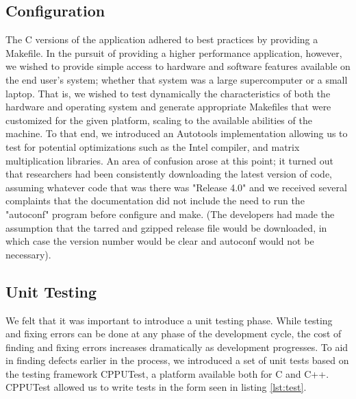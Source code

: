 \documentclass[acmtog, authorversion]{acmart}
\begin{document}
\subsection{Configuration}
The C versions of the application adhered to best practices by providing a Makefile. In the pursuit of providing a higher performance application, however, we wished to provide simple access to hardware and software features available on the end user's system; whether that system was a large supercomputer or a small laptop. That is, we wished to test dynamically the characteristics of both the hardware and operating system and generate appropriate Makefiles that were customized for the given platform, scaling to the available abilities of the machine. To that end, we introduced an Autotools \cite{Hagen2006} implementation allowing us to test for potential optimizations such as the Intel compiler, and matrix multiplication libraries. An area of confusion arose at this point; it turned out that researchers had been consistently downloading the latest version of code, assuming whatever code that was there was "Release 4.0" and we received several complaints that the documentation did not include the need to run the "autoconf" program before configure and make. (The developers had made the assumption that the tarred and gzipped release file would be downloaded, in which case the version number would be clear and autoconf would not be necessary).

\subsection{Unit Testing} \label{sec:tests}
We felt that it was important to introduce a unit testing phase. While testing and fixing errors can be done at any phase of the development cycle, the cost of finding and fixing errors increases dramatically as development progresses. To aid in finding defects earlier in the process, we introduced a set of unit tests based on the testing framework CPPUTest, a platform available both for C and C++.  CPPUTest allowed us to write tests in the form seen in listing \ref{lst:test}.
\end{document}

